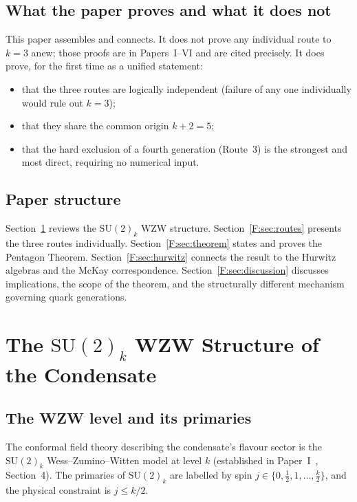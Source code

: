 \documentclass[11pt,a4paper]{article}
\theoremstyle{definition}
\theoremstyle{remark}
\begin{document}
\subsection{What the paper proves and what it does not}

This paper assembles and connects.
It does not prove any individual route to $k=3$ anew; those proofs are in
Papers~I--VI and are cited precisely.
It does prove, for the first time as a unified statement:
\begin{itemize}
\item that the three routes are logically independent
  (failure of any one individually would rule out $k=3$);
\item that they share the common origin $k+2=5$;
\item that the hard exclusion of a fourth generation
  (Route~3) is the strongest and most direct,
  requiring no numerical input.
\end{itemize}

\subsection{Paper structure}

Section~\ref{F:sec:WZW} reviews the $\mathrm{SU}(2)_k$ WZW structure.
Section~\ref{F:sec:routes} presents the three routes individually.
Section~\ref{F:sec:theorem} states and proves the Pentagon Theorem.
Section~\ref{F:sec:hurwitz} connects the result to the Hurwitz algebras
and the McKay correspondence.
Section~\ref{F:sec:discussion} discusses implications, the scope of the theorem,
and the structurally different mechanism governing quark generations.

\section{The $\mathrm{SU}(2)_k$ WZW Structure of the Condensate}
\label{F:sec:WZW}

\subsection{The WZW level and its primaries}

The conformal field theory describing the condensate's flavour sector is
the $\mathrm{SU}(2)_k$ Wess--Zumino--Witten model at level $k$
(established in Paper~I~\cite{Paper1}, Section~4).
The primaries of $\mathrm{SU}(2)_k$ are labelled by spin $j\in\{0,\tfrac{1}{2},1,\ldots,\tfrac{k}{2}\}$,
and the physical constraint is $j \leq k/2$.
\end{document}
